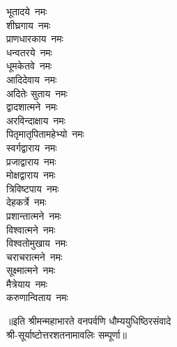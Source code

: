 \begin{multicols}{2}
\begin{flushleft}
भूतादये~नमः\\
शीघ्रगाय~नमः\hfill{}\\
प्राणधारकाय~नमः\\
धन्वतरये~नमः\\
धूमकेतवे~नमः\\
आदिदेवाय~नमः\\
अदितेः सुताय~नमः\\
द्वादशात्मने~नमः\\
अरविन्दाक्षाय~नमः\\
पितृमातृपितामहेभ्यो~नमः\\
स्वर्गद्वाराय~नमः\\
प्रजाद्वाराय~नमः\hfill{}\\
मोक्षद्वाराय~नमः\\
त्रिविष्टपाय~नमः\\
देहकर्त्रे~नमः\\
प्रशान्तात्मने~नमः\\
विश्वात्मने~नमः\\
विश्वतोमुखाय~नमः\\
चराचरात्मने~नमः\\
सूक्ष्मात्मने~नमः\\
मैत्रेयाय~नमः\\
करुणान्विताय~नमः\hfill{}\\
    \end{flushleft}
\end{multicols}
॥इति श्रीमन्महाभारते वनपर्वणि धौम्ययुधिष्ठिरसंवादे\\श्री-सूर्याष्टोत्तरशतनामावलिः सम्पूर्णा॥
